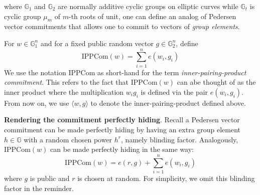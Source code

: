 \documentclass{article}
\begin{document}
where $\mathbb{G}_1$ and $\mathbb{G}_2$ are normally additive cyclic groups on elliptic curves while $\mathbb{G}_t$ is cyclic group $\mu_m$ of $m$-th roots of unit, one can define an analog of Pedersen vector commitments that allows one to commit to vectors of \textit{group elements}. 

For $w \in \mathbb{G}_1^n$ and for a fixed public random vector $g \in \mathbb{G}_2^n$, define 
\begin{equation*}
\text{IPPCom}(w) = \sum_{i = 1}^n e(w_i, g_i)
\end{equation*}
We use the notation $\text{IPPCom}$ as short-hand for the term \textit{inner-pairing-product commitment}. This refers to the fact that $\text{IPPCom}(w)$ can abe thought of as the inner product where the multiplication $w_i g_i$ is defined via the pair $e(w_i, g_i)$. From now on, we use $\langle w, g \rangle$ to denote the inner-pairing-product defined above. 

\textbf{Rendering the commitment perfectly hiding}. Recall a Pedersen vector commitment can be made perfectly hiding by having an extra group element $h \in \mathbb{G}$ with a random chosen power $h^r$, namely blinding factor. Analogously, $\text{IPPCom}(w)$ can be made perfectly hiding in the same way:
\begin{equation*}
\text{IPPCom}(w) = e(r, g) + \sum_{i = 1}^n e(w_i, g_i)
\end{equation*}
where $g$ is public and $r$ is chosen at random. For simplicity, we omit this blinding factor in the reminder. 
\end{document}
